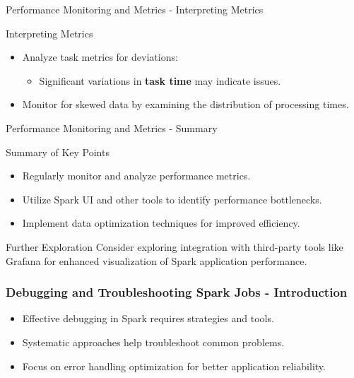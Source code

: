 \documentclass[aspectratio=169]{beamer}
\begin{document}
\begin{frame}[fragile]{Performance Monitoring and Metrics - Interpreting Metrics}
    \begin{block}{Interpreting Metrics}
        \begin{itemize}
            \item Analyze task metrics for deviations:
            \begin{itemize}
                \item Significant variations in \textbf{task time} may indicate issues.
            \end{itemize}
            \item Monitor for skewed data by examining the distribution of processing times.
        \end{itemize}
    \end{block}
\end{frame}

\begin{frame}[fragile]{Performance Monitoring and Metrics - Summary}
    \begin{block}{Summary of Key Points}
        \begin{itemize}
            \item Regularly monitor and analyze performance metrics.
            \item Utilize Spark UI and other tools to identify performance bottlenecks.
            \item Implement data optimization techniques for improved efficiency.
        \end{itemize}
    \end{block}
    
    \begin{block}{Further Exploration}
        Consider exploring integration with third-party tools like Grafana for enhanced visualization of Spark application performance.
    \end{block}
\end{frame}

\begin{frame}[fragile]
    \frametitle{Debugging and Troubleshooting Spark Jobs - Introduction}
    \begin{itemize}
        \item Effective debugging in Spark requires strategies and tools.
        \item Systematic approaches help troubleshoot common problems.
        \item Focus on error handling optimization for better application reliability.
    \end{itemize}
\end{frame}
\end{document}
